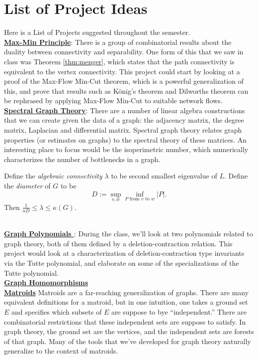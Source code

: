 \chapter{List of Project Ideas}
Here is a List of Projects suggested throughout the semester. \\

\noindent \textbf{\hyperref[proj:maxmin]{ Max-Min Principle}}: There is a group of combinatorial results about the duality between connectivity and separability. One form of this that we saw in class was Theorem \ref{thm:menger}, which states that the path connectivity is equivalent to the vertex connectivity. This project could start by looking at a proof of the Max-Flow Min-Cut theorem, which is a powerful generalization of this, and prove that results such as K\"onig's theorem and Dilworths theorem can be rephrased by applying Max-Flow Min-Cut to suitable network flows. \\


\noindent \textbf{\hyperref[proj:spectral]{ Spectral Graph Theory}}: There are a number of linear algebra constructions that we can create given the data of a graph: the adjacency matrix, the degree matrix, Laplacian and differential matrix. Spectral graph theory relates graph properties (or estimates on graphs) to the spectral theory of these matrices. An interesting place to focus would be the isoperimetric number, which numerically characterizes the number of bottlenecks in a graph. 
\begin{theorem}
	Define the \emph{algebraic connectivity $\lambda$} to be second smallest eigenvalue of $L$.
	Define the \emph{diameter} of $G$ to be 
	\[
		D:=\sup_{v, w}\inf_{\text{$P$ from $v$ to $w$}} |P|.
	\]
	Then $\frac{1}{nD}\leq \lambda \leq \kappa(G)$.
\end{theorem}\\

\noindent \textbf{\hyperref[proj:polynomials]{ Graph Polynomials }}: During the class, we'll look at two polynomials related to graph theory, both of them defined by a deletion-contraction relation. This project would look at a characterization of deletion-contraction type invariants via the Tutte polynomial, and elaborate on some of the specializations of the Tutte polynomial. \\

\noindent \textbf{\hyperref[proj:graphhomo]{ Graph Homomorphisms }}\\

\noindent \textbf{\hyperref[proj:matroids]{ Matroids} } Matroids are a far-reaching generalization of graphs. There are many equivalent definitions for a matroid, but in one intuition, one takes a ground set $E$ and specifies which subsets of $E$ are suppose to bye ``independent.'' There are combinatorial restrictions that these independent sets are suppose to satisfy. In graph theory, the ground set are the vertices, and the independent sets are forests of that graph. Many of the tools that we've developed for graph theory naturally generalize to the context of matroids. \\

